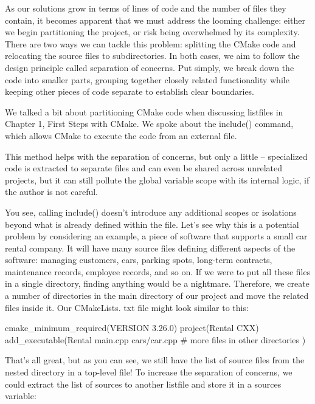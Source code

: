 As our solutions grow in terms of lines of code and the number of files they contain, it becomes apparent that we must address the looming challenge: either we begin partitioning the project, or risk being overwhelmed by its complexity. There are two ways we can tackle this problem: splitting the CMake code and relocating the source files to subdirectories. In both cases, we aim to follow the design principle called separation of concerns. Put simply, we break down the code into smaller parts, grouping together closely related functionality while keeping other pieces of code separate to establish clear boundaries.

We talked a bit about partitioning CMake code when discussing listfiles in Chapter 1, First Steps with CMake. We spoke about the include() command, which allows CMake to execute the code from an external file.

This method helps with the separation of concerns, but only a little – specialized code is extracted to separate files and can even be shared across unrelated projects, but it can still pollute the global variable scope with its internal logic, if the author is not careful.

You see, calling include() doesn’t introduce any additional scopes or isolations beyond what is already defined within the file. Let’s see why this is a potential problem by considering an example, a piece of software that supports a small car rental company. It will have many source files defining different aspects of the software: managing customers, cars, parking spots, long-term contracts, maintenance records, employee records, and so on. If we were to put all these files in a single directory, finding anything would be a nightmare. Therefore, we create a number of directories in the main directory of our project and move the related files inside it. Our CMakeLists.
txt file might look similar to this:


\begin{cmake}
cmake_minimum_required(VERSION 3.26.0)
project(Rental CXX)
add_executable(Rental
               main.cpp
               cars/car.cpp
               # more files in other directories
)
\end{cmake}

That’s all great, but as you can see, we still have the list of source files from the nested directory in a top-level file! To increase the separation of concerns, we could extract the list of sources to another listfile and store it in a sources variable:


